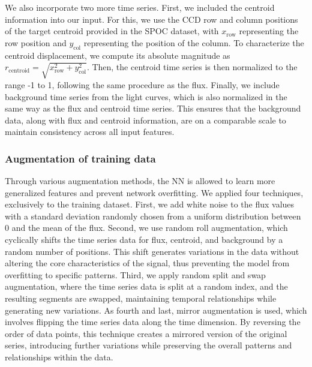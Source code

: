 We also incorporate two more time series. First, we included the centroid information into our input. For this, we use the CCD row and column positions of the target centroid provided in the SPOC dataset, with $x_{\mathrm{row}}$ representing the row position and $y_{\mathrm{col}}$ representing the position of the column. To characterize the centroid displacement, we compute its absolute magnitude as $r_{\mathrm{centroid}} = \sqrt{x^2_{\mathrm{row}} + y^2_{\mathrm{col}}}$. Then, the centroid time series is then normalized to the range -1 to 1, following the same procedure as the flux. Finally, we include background time series from the light curves, which is also normalized in the same way as the flux and centroid time series. This ensures that the background data, along with flux and centroid information, are on a comparable scale to maintain consistency across all input features.  \par


\subsubsection{Augmentation of training data}
\label{sec:augmentation}
Through various augmentation methods, the NN is allowed to learn more generalized features and prevent network overfitting. We applied four techniques, exclusively to the training dataset. First, we add white noise to the flux values with a standard deviation randomly chosen from a uniform distribution between 0 and the mean of the flux. Second, we use random roll augmentation, which cyclically shifts the time series data for flux, centroid, and background by a random number of positions. This shift generates variations in the data without altering the core characteristics of the signal, thus preventing the model from overfitting to specific patterns. Third, we apply random split and swap augmentation, where the time series data is split at a random index, and the resulting segments are swapped, maintaining temporal relationships while generating new variations. As fourth and last, mirror augmentation is used, which involves flipping the time series data along the time dimension. By reversing the order of data points, this technique creates a mirrored version of the original series, introducing further variations while preserving the overall patterns and relationships within the data. \par

